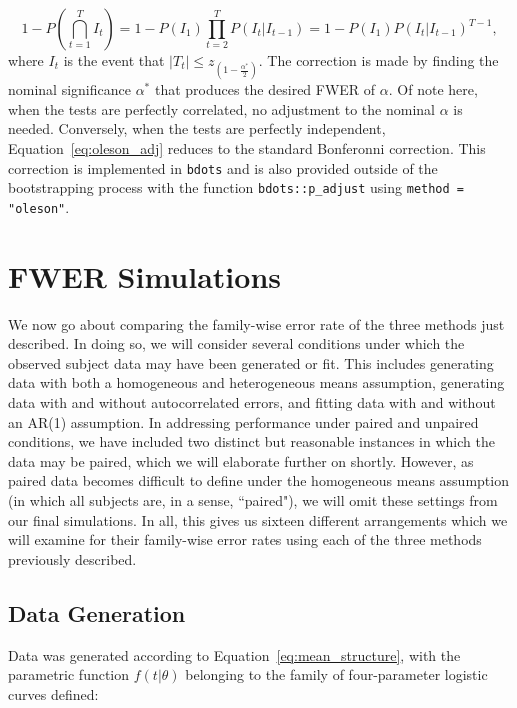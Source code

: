 \documentclass{article}
\newcommand{\xt}{\texttt}
\begin{document}
\begin{equation}\label{eq:oleson_adj}
1 - P \left( \bigcap_{t=1}^T I_t \right) = 1 - P(I_1) \prod_{t=2}^T P(I_t | I_{t-1}) = 1 - P(I_1)P(I_t|I_{t-1})^{T-1},
\end{equation}
where $I_t$ is the event that $|T_t| \leq z_{\left(1 - \frac{\alpha^*}{2} \right)}$. The correction is made by finding the nominal significance $\alpha^*$ that produces the desired FWER of $\alpha$. Of note here, when the tests are perfectly correlated, no adjustment to the nominal $\alpha$ is needed. Conversely, when the tests are perfectly independent, Equation~\ref{eq:oleson_adj} reduces to the standard Bonferonni correction. This correction is implemented in \xt{bdots} and is also provided outside of the bootstrapping process with the function \xt{bdots::p\_adjust} using \xt{method = "oleson"}.

\section{FWER Simulations}

We now go about comparing the family-wise error rate of the three methods just described. In doing so, we will consider several conditions under which the observed subject data may have been generated or fit. This includes generating data with both a homogeneous and heterogeneous means assumption, generating data with and without autocorrelated errors, and fitting data with and without an AR(1) assumption. In addressing performance under paired and unpaired conditions, we have included two distinct but reasonable instances in which  the data may be paired, which we will elaborate further on shortly. However, as paired data becomes difficult to define under the homogeneous means assumption (in which all subjects are, in a sense, ``paired"), we will omit these settings from our final simulations. In all, this gives us sixteen different arrangements which we will examine for their family-wise error rates using each of the three methods previously described.



\subsection{Data Generation}

Data was generated according to Equation~\ref{eq:mean_structure}, with the parametric function $f(t|\theta)$ belonging to the family of four-parameter logistic curves defined:
\end{document}
